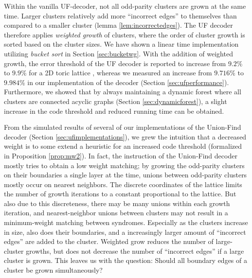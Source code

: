 Within the vanilla UF-decoder, not all odd-parity clusters are grown at the same time. Larger clusters relatively add more ``incorrect edges'' to themselves than compared to a smaller cluster (lemma \ref{lem:incorrectedges}). The UF decoder therefore applies \emph{weighted growth} of clusters, where the order of cluster growth is sorted based on the cluster sizes. We have shown a linear time implementation utilizing \emph{bucket sort} in Section \ref{sec:bucketwg}. With the addition of weighted growth, the error threshold of the UF decoder is reported to increase from $9.2\%$ to $9.9\%$ for a 2D toric lattice \cite{delfosse2017almost}, whereas we measured an increase from $9.716\%$ to $9.984\%$ in our implementation of the decoder (Section \ref{sec:ufperformance}). Furthermore, we showed that by always maintaining a dynamic forest where all clusters are connected acyclic graphs (Section \ref{sec:dynamicforest}), a slight increase in the code threshold and reduced running time can be obtained. 

From the simulated results of several of our implementations of the Union-Find decoder (Section \ref{sec:ufimplementations}), we grew the intuition that a decreased weight is to some extend a heuristic for an increased code threshold (formalized in Proposition \ref{prop:mw2}). In fact, the instruction of the Union-Find decoder mostly tries to obtain a low weight matching; by growing the odd-parity clusters on their boundaries a single layer at the time, unions between odd-parity clusters mostly occur on nearest neighbors. The discrete coordinates of the lattice limits the number of growth iterations to a constant proportional to the lattice. But also due to this discreteness, there may be many unions within each growth iteration, and nearest-neighbor unions between clusters may not result in a minimum-weight matching between syndromes. Especially as the clusters increase in size, also does their boundaries, and a increasingly larger amount of ``incorrect edges'' are added to the cluster. Weighted grow reduces the number of large-cluster growths, but does not decrease the number of ``incorrect edges'' if a large cluster is grown. This leaves us with the question: Should all boundary edges of a cluster be grown simultaneously?

